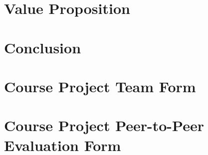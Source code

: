 \documentclass[12pt]{article}
\renewcommand{\_}{\kern-1.5pt\textunderscore\kern-1.5pt}
\begin{document}
\section{Value Proposition}


\section{Conclusion}

\newpage


\begingroup
\raggedright

{}

\nocite{*}

\endgroup

\newpage

\begin{appendices}

	\section{Course Project Team Form}
	\newpage

	\section{Course Project Peer-to-Peer Evaluation Form}
	\newpage

\end{appendices}
\end{document}
